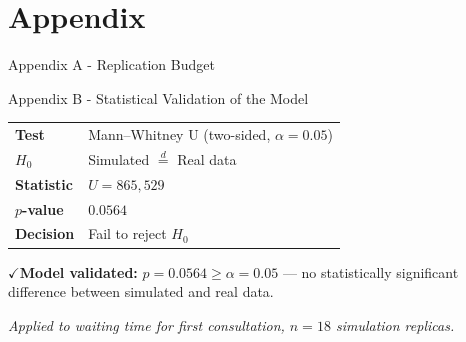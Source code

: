 \documentclass[xcolor=svgnames]{beamer}
\begin{document}
\section{Appendix}
\begin{frame}{Appendix A - Replication Budget}
	\centering
	\scriptsize
	\renewcommand{\arraystretch}{1.4}
\end{frame}


\begin{frame}{Appendix B - Statistical Validation of the Model}
	\begin{tcolorbox}[
		colback=gray!8, colframe=gray!40,
		boxrule=0.5pt, arc=2mm,
		left=3mm, right=3mm, top=1.5mm, bottom=1.5mm
		]
		\footnotesize
		\begin{tabular}{@{}ll@{}}
			\textbf{Test}        & Mann--Whitney U (two-sided, $\alpha=0.05$) \\[0.2em]
			\textbf{$H_0$}       & Simulated $\overset{d}{=}$ Real data       \\[0.2em]
			\textbf{Statistic}   & $U = 865{,}529$                            \\[0.2em]
			\textbf{$p$-value}   & $0.0564$                                   \\[0.2em]
			\textbf{Decision}    & Fail to reject $H_0$                       \\
		\end{tabular}
	\end{tcolorbox}

	\vspace{0.4em}

	\begin{tcolorbox}[
		colback=ucblue!10, colframe=ucblue,
		boxrule=0.8pt, arc=2mm,
		left=3mm, right=3mm, top=2mm, bottom=2mm
		]
		\footnotesize\centering
		$\checkmark$\;\textbf{Model validated:}
		$p=0.0564 \geq \alpha=0.05$ --- no statistically significant difference
		between simulated and real data.
	\end{tcolorbox}

	{\scriptsize\textit{Applied to waiting time for first consultation, $n{=}18$ simulation replicas.}}
\end{frame}
\end{document}
